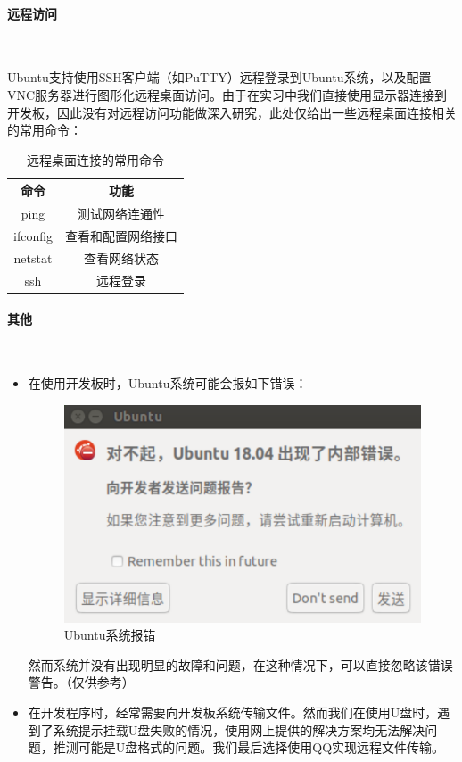 \documentclass[UTF8]{article}
\begin{document}
\paragraph{远程访问}~{}

Ubuntu支持使用SSH客户端（如PuTTY）远程登录到Ubuntu系统，以及配置VNC服务器进行图形化远程桌面访问。由于在实习中我们直接使用显示器连接到开发板，因此没有对远程访问功能做深入研究，此处仅给出一些远程桌面连接相关的常用命令：

\begin{table}[H] %
\centering %
\begin{tabular}{cc} %
    \toprule %
    命令 & 功能 \\
    \midrule %
    ping & 测试网络连通性 \\
    ifconfig & 查看和配置网络接口 \\
    netstat & 查看网络状态 \\
    ssh & 远程登录 \\
    \bottomrule %
\end{tabular}
\caption{远程桌面连接的常用命令} %
\end{table} 

\paragraph{其他}~{}

\begin{itemize}
    \item 在使用开发板时，Ubuntu系统可能会报如下错误：
    \begin{figure}[H]
    \centering %
    \includegraphics[width=.6\textwidth]{figure/系统报错.png} 
    \caption{Ubuntu系统报错} %
    \end{figure}
    然而系统并没有出现明显的故障和问题，在这种情况下，可以直接忽略该错误警告。（仅供参考）
    \item 在开发程序时，经常需要向开发板系统传输文件。然而我们在使用U盘时，遇到了系统提示挂载U盘失败的情况，使用网上提供的解决方案均无法解决问题，推测可能是U盘格式的问题。我们最后选择使用QQ实现远程文件传输。
\end{itemize}
\end{document}
